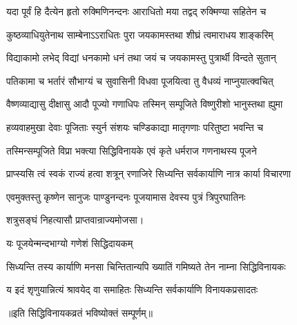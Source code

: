 \twolineshloka
{यदा पूर्वं हि दैत्येन हृतो रुक्मिणिनन्दनः}
{आराधितो मया तद्वद् रुक्मिण्या सहितेन च}%

\twolineshloka
{कुष्ठव्याधियुतेनाथ साम्बेनाऽऽराधितः पुरा}
{जयकामस्तथा शीघ्रं त्वमाराधय शाङ्करिम्}%

\twolineshloka
{विद्याकामो लभेद् विद्यां धनकामो धनं तथा}
{जयं च जयकामस्तु पुत्रार्थी विन्दते सुतान्}%

\twolineshloka
{पतिकामा च भर्तारं सौभाग्यं च सुवासिनी}
{विधवा पूजयित्वा तु वैधव्यं नाप्नुयात्क्वचित्}%

\twolineshloka
{वैष्णव्याद्यासु दीक्षासु आदौ पूज्यो गणाधिपः}
{तस्मिन् सम्पूजिते विष्णुरीशो भानुस्तथा ह्युमा}%

\twolineshloka
{हव्यवाहमुखा देवाः पूजिताः स्युर्न संशयः}
{चण्डिकाद्या मातृगणाः परितुष्टा भवन्ति च}%

\twolineshloka
{तस्मिन्सम्पूजिते विप्रा भक्त्या सिद्धिविनायके}
{एवं कृते धर्मराज गणनाथस्य पूजने}%

\twolineshloka
{प्राप्स्यसि त्वं स्वकं राज्यं हत्वा शत्रून् रणाजिरे}
{सिध्यन्ति सर्वकार्याणि नात्र कार्या विचारणा}%

\twolineshloka
{एवमुक्तस्तु कृष्णेन सानुजः पाण्डुनन्दनः}
{पूजयामास देवस्य पुत्रं त्रिपुरघातिनः}%

शत्रुसङ्घं निहत्यासौ प्राप्तवान्राज्यमोजसा।

\onelineshloka
{यः पूजयेन्मन्दभाग्यो गणेशं सिद्धिदायकम्}%

\twolineshloka
{सिध्यन्ति तस्य कार्याणि मनसा चिन्तितान्यपि}
{ख्यातिं गमिष्यते तेन नाम्ना सिद्धिविनायकः}%

\twolineshloka
{य इदं शृणुयान्नित्यं श्रावयेद् वा समाहितः}
{सिध्यन्ति सर्वकार्याणि विनायकप्रसादतः}%

॥इति सिद्धिविनायकव्रतं भविष्योक्तं सम्पूर्णम्॥
